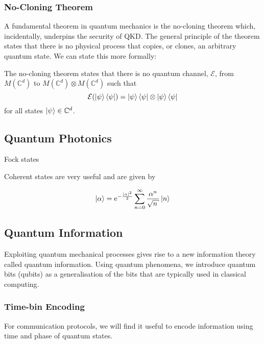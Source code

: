 \subsubsection{No-Cloning Theorem}

A fundamental theorem in quantum mechanics is the {\color{bristol-red} no-cloning theorem} which, incidentally, underpins the security of \ac{QKD}. The general principle of the theorem states that there is no physical process that copies, or clones, an arbitrary quantum state. We can state this more formally:

\begin{theo}
	 The no-cloning theorem states that there is no quantum channel, $\mathcal{E}$, from $M(\mathbb{C}^d)$ to $M(\mathbb{C}^d) \otimes M(\mathbb{C}^d)$ such that
	 \begin{equation*}
	 	\mathcal{E}(\ket{\psi}\bra{\psi}) = \ket{\psi}\bra{\psi} \otimes \ket{\psi}\bra{\psi}
	 \end{equation*}
	 for all states $\ket{\psi} \in \mathbb{C}^d$.
\end{theo}


\subsection{Quantum Photonics}

Fock states

Coherent states are very useful and are given by

\begin{equation}
	\ket{\alpha} = \mathrm{e}^{-\frac{|\alpha|^2}{2}} \sum_{n=0}^\infty \frac{\alpha^n}{\sqrt{n}} \ket{n} 
\end{equation}

\subsection{Quantum Information}

Exploiting quantum mechanical processes gives rise to a new information theory called {\textcolor{bristol-red} quantum information}. Using quantum phenomena, we introduce quantum bits (qubits) as a generalisation of the bits that are typically used in classical computing.

\subsubsection{Time-bin Encoding}

For communication protocols, we will find it useful to encode information using time and phase of quantum states.

